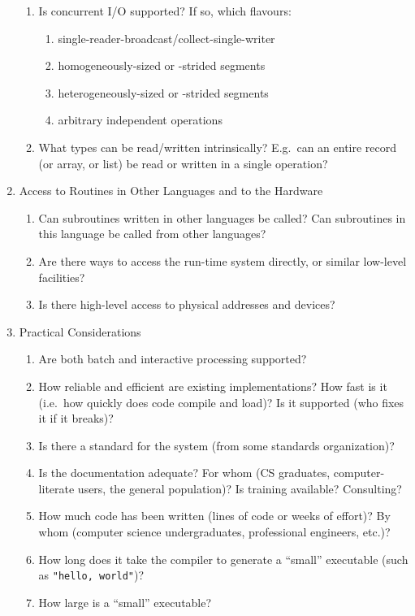 \begin{enumerate}
\begin{enumerate}
  \item Is concurrent I/O supported?  If so, which flavours:
    \begin{enumerate}
    \item single-reader-broadcast/collect-single-writer
    \item homogeneously-sized or -strided segments
    \item heterogeneously-sized or -strided segments
    \item arbitrary independent operations
    \end{enumerate}
  \item What types can be read/written intrinsically?
	E.g.\ can an entire record (or array, or list)
	be read or written in a single operation?
  \end{enumerate}
\item Access to Routines in Other Languages and to the Hardware
  \begin{enumerate}
  \item Can subroutines written in other languages be called?
        Can subroutines in this language be called from other languages?
  \item Are there ways to access the run-time system directly,
	or similar low-level facilities?
  \item Is there high-level access to physical addresses and devices?
  \end{enumerate}
\item Practical Considerations
  \begin{enumerate}
  \item Are both batch and interactive processing supported?
  \item How reliable and efficient are existing implementations?
	How fast is it (i.e.\ how quickly does code compile and load)?
	Is it supported (who fixes it if it breaks)?
  \item Is there a standard for the system (from some standards organization)?
  \item Is the documentation adequate? For whom (CS graduates, computer-literate
	users, the general population)? Is training available?	Consulting?
  \item How much code has been written (lines of code or weeks of effort)?
        By whom (computer science undergraduates, professional engineers, etc.)?
  \item How long does it take the compiler to generate a ``small'' executable
        (such as {\tt{"hello, world"}})?
  \item How large is a ``small'' executable?

\end{enumerate}
\end{enumerate}
